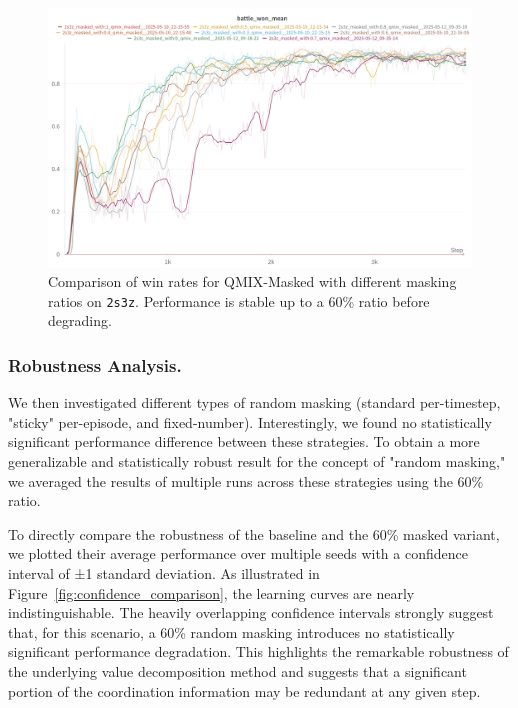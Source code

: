 \documentclass[../Main.tex]{subfiles}
\begin{document}
\begin{figure}[H]
    \centering
    \includegraphics[width=0.7\linewidth]{img/results-analysis/2s3z-multiple-hyperparametrs.png} %
    \caption{Comparison of win rates for QMIX-Masked with different masking ratios on \texttt{2s3z}. Performance is stable up to a 60\% ratio before degrading.}
    \label{fig:masking_ratio_comparison}
\end{figure}

\subsubsection{Robustness Analysis.}
We then investigated different types of random masking (standard per-timestep, "sticky" per-episode, and fixed-number). Interestingly, we found no statistically significant performance difference between these strategies. To obtain a more generalizable and statistically robust result for the concept of "random masking," we averaged the results of multiple runs across these strategies using the 60\% ratio.

To directly compare the robustness of the baseline and the 60\% masked variant, we plotted their average performance over multiple seeds with a confidence interval of ±1 standard deviation. As illustrated in Figure~\ref{fig:confidence_comparison}, the learning curves are nearly indistinguishable. The heavily overlapping confidence intervals strongly suggest that, for this scenario, a 60\% random masking introduces no statistically significant performance degradation. This highlights the remarkable robustness of the underlying value decomposition method and suggests that a significant portion of the coordination information may be redundant at any given step.
\end{document}
